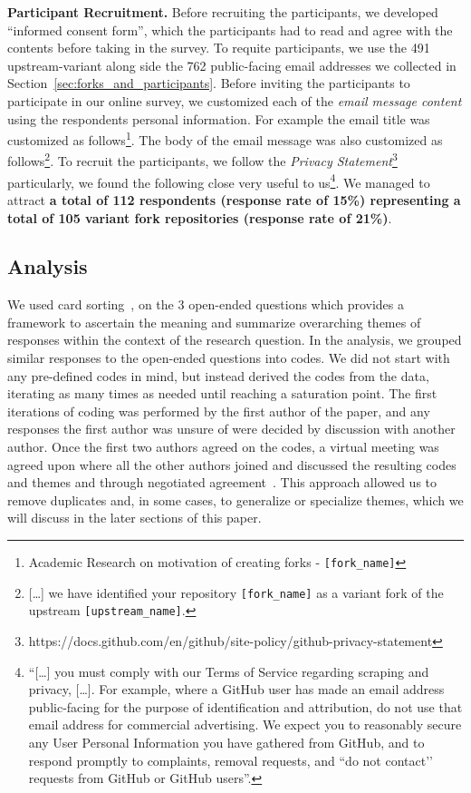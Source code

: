 \nd \textbf{Participant Recruitment.} Before recruiting the participants, we developed ``informed consent form'', which the participants had to read and agree with the contents before taking in the survey. 
To requite participants, we use the 491 upstream-variant along side the 762 public-facing email addresses we collected in Section~\ref{sec:forks_and_participants}. Before inviting the participants to participate in our online survey, we customized each of the \textit{email message content} using the respondents personal information. For example the email title was customized as follows\footnote{Academic Research on motivation of creating forks - \texttt{[fork\_name]}}. The body of the email message was also customized as follows\footnote{[\ldots] we have identified your \gh repository \texttt{[fork\_name]} as a variant fork of the upstream \texttt{[upstream\_name]}.}.
To recruit the participants, we follow the \textit{\gh Privacy Statement}\footnote{https://docs.github.com/en/github/site-policy/github-privacy-statement} particularly, we found the following close very useful to us\footnote{``[\ldots] you must comply with our Terms of Service regarding scraping and privacy, [\ldots]. For example, where a GitHub user has made an email address public-facing for the purpose of identification and attribution, do not use that email address for commercial advertising. We expect you to reasonably secure any User Personal Information you have gathered from GitHub, and to respond promptly to complaints, removal requests, and ``do not contact’’ requests from GitHub or GitHub users''.}. We managed to attract \textbf{a total of 112 respondents (response rate of 15\%) representing a total of 105 variant fork repositories (response rate of 21\%)}.



\subsection{Analysis}
\label{sec:card_sorting}
We used card sorting~\cite{zimmermann2016card}, on the 3 open-ended questions which provides a framework to ascertain the meaning and summarize overarching themes of responses within the context of the research question. In the analysis, we grouped similar responses to the open-ended questions into codes. We did not start with any pre-defined codes in mind, but instead derived the codes from the data, iterating as many times as needed until reaching a saturation point. The first iterations of coding was performed by the first author of the paper, and any responses the first author was unsure of were decided by discussion with another author. Once the first two authors agreed on the codes, a virtual meeting was agreed upon where all the other authors joined and discussed the resulting codes and themes and through negotiated agreement~\cite{Garrison:2006}. This approach allowed us to remove duplicates and, in some cases, to generalize or specialize themes, which we will discuss in the later sections of this paper.



